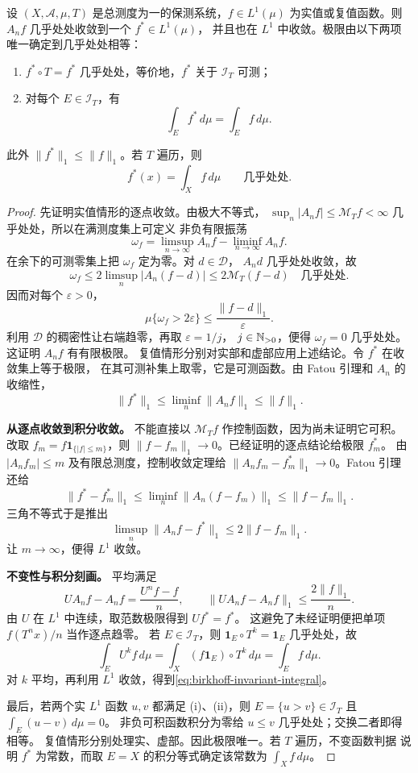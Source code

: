 \begin{theorem}
\label{thm:birkhoff-pointwise-ergodic}
设 $(X,\mathcal A,\mu,T)$ 是总测度为一的保测系统，$f\in L^1(\mu)$
为实值或复值函数。则 $A_nf$ 几乎处处收敛到一个 $f^*\in L^1(\mu)$，
并且也在 $L^1$ 中收敛。极限由以下两项唯一确定到几乎处处相等：
\begin{enumerate}[label=\textup{(\roman*)}]
 \item $f^*\circ T=f^*$ 几乎处处，等价地，$f^*$ 关于 $\mathcal I_T$ 可测；
 \item 对每个 $E\in\mathcal I_T$，有
 \begin{equation}\label{eq:birkhoff-invariant-integral}
  \int_Ef^*\,d\mu=\int_Ef\,d\mu.
 \end{equation}
\end{enumerate}
此外 $\|f^*\|_1\le\|f\|_1$。若 $T$ 遍历，则
\[
 f^*(x)=\int_Xf\,d\mu\qquad\text{几乎处处}.
\]
\end{theorem}
\begin{proof}
先证明实值情形的逐点收敛。由极大不等式，
$\sup_n|A_nf|\le\mathcal M_Tf<\infty$ 几乎处处，所以在满测度集上可定义
非负有限振荡
\[
 \omega_f=\limsup_{n\to\infty}A_nf-\liminf_{n\to\infty}A_nf.
\]
在余下的可测零集上把 $\omega_f$ 定为零。对 $d\in\mathcal D$，
$A_nd$ 几乎处处收敛，故
\[
 \omega_f\le2\limsup_n|A_n(f-d)|\le2\mathcal M_T(f-d)
 \quad\text{几乎处处}.
\]
因而对每个 $\varepsilon>0$，
\[
 \mu\{\omega_f>2\varepsilon\}
 \le\frac{\|f-d\|_1}{\varepsilon}.
\]
利用 $\mathcal D$ 的稠密性让右端趋零，再取 $\varepsilon=1/j$，
$j\in\mathbb{N}_{>0}$，便得 $\omega_f=0$ 几乎处处。这证明 $A_nf$ 有有限极限。
复值情形分别对实部和虚部应用上述结论。令 $f^*$ 在收敛集上等于极限，
在其可测补集上取零，它是可测函数。由 Fatou 引理和 $A_n$ 的收缩性，
\[
 \|f^*\|_1\le\liminf_n\|A_nf\|_1\le\|f\|_1.
\]

\medskip\noindent\textbf{从逐点收敛到积分收敛。}
不能直接以 $\mathcal M_Tf$ 作控制函数，因为尚未证明它可积。
改取 $f_m=f\mathbf1_{\{|f|\le m\}}$，则
$\|f-f_m\|_1\to0$。已经证明的逐点结论给极限 $f_m^*$。
由 $|A_nf_m|\le m$ 及有限总测度，控制收敛定理给
$\|A_nf_m-f_m^*\|_1\to0$。Fatou 引理还给
\[
 \|f^*-f_m^*\|_1
 \le\liminf_n\|A_n(f-f_m)\|_1\le\|f-f_m\|_1.
\]
三角不等式于是推出
\[
 \limsup_n\|A_nf-f^*\|_1\le2\|f-f_m\|_1.
\]
让 $m\to\infty$，便得 $L^1$ 收敛。

\medskip\noindent\textbf{不变性与积分刻画。}
平均满足
\[
 UA_nf-A_nf=\frac{U^nf-f}{n},
 \qquad\|UA_nf-A_nf\|_1\le\frac{2\|f\|_1}{n}.
\]
由 $U$ 在 $L^1$ 中连续，取范数极限得到 $Uf^*=f^*$。
这避免了未经证明便把单项 $f(T^nx)/n$ 当作逐点趋零。
若 $E\in\mathcal I_T$，则 $\mathbf1_E\circ T^k=\mathbf1_E$ 几乎处处，故
\[
 \int_EU^kf\,d\mu
 =\int_X(f\mathbf1_E)\circ T^k\,d\mu
 =\int_Ef\,d\mu.
\]
对 $k$ 平均，再利用 $L^1$ 收敛，得到\eqref{eq:birkhoff-invariant-integral}。

最后，若两个实 $L^1$ 函数 $u,v$ 都满足 (i)、(ii)，则
$E=\{u>v\}\in\mathcal I_T$ 且 $\int_E(u-v)\,d\mu=0$。
非负可积函数积分为零给 $u\le v$ 几乎处处；交换二者即得相等。
复值情形分别处理实、虚部。因此极限唯一。若 $T$ 遍历，不变函数判据
说明 $f^*$ 为常数，而取 $E=X$ 的积分等式确定该常数为 $\int_Xf\,d\mu$。
\end{proof}

